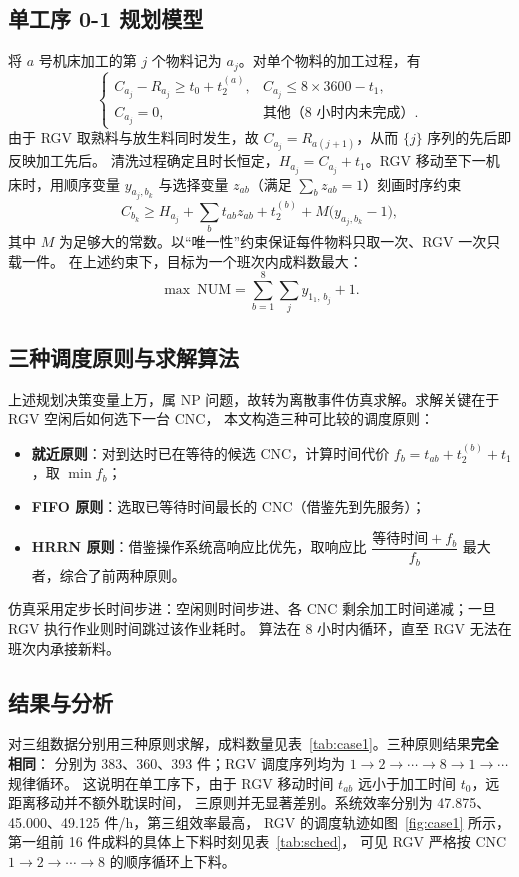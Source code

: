\documentclass{cumcmthesis}
\begin{document}
\subsection{单工序 0-1 规划模型}
将 $a$ 号机床加工的第 $j$ 个物料记为 $a_j$。对单个物料的加工过程，有
\begin{equation}
\begin{cases}
C_{a_j}-R_{a_j}\ge t_0+t_2^{(a)}, & C_{a_j}\le 8\times3600-t_1,\\
C_{a_j}=0, & \text{其他（8 小时内未完成）}.
\end{cases}
\end{equation}
由于 RGV 取熟料与放生料同时发生，故 $C_{a_j}=R_{a(j+1)}$，从而 $\{j\}$ 序列的先后即反映加工先后。
清洗过程确定且时长恒定，$H_{a_j}=C_{a_j}+t_1$。RGV 移动至下一机床时，用顺序变量 $y_{a_j,b_k}$
与选择变量 $z_{ab}$（满足 $\sum_b z_{ab}=1$）刻画时序约束
\begin{equation}
C_{b_k}\ge H_{a_j}+\sum_{b}t_{ab}z_{ab}+t_2^{(b)}+M\big(y_{a_j,b_k}-1\big),
\end{equation}
其中 $M$ 为足够大的常数。以“唯一性”约束保证每件物料只取一次、RGV 一次只载一件。
在上述约束下，目标为一个班次内成料数最大：
\begin{equation}
\max\ \mathrm{NUM}=\sum_{b=1}^{8}\sum_{j}y_{1_1,\,b_j}+1 .
\end{equation}

\subsection{三种调度原则与求解算法}
上述规划决策变量上万，属 NP 问题，故转为离散事件仿真求解。求解关键在于 RGV 空闲后如何选下一台 CNC，
本文构造三种可比较的调度原则：
\begin{itemize}
    \item \textbf{就近原则}：对到达时已在等待的候选 CNC，计算时间代价 $f_b=t_{ab}+t_2^{(b)}+t_1$，取 $\min f_b$；
    \item \textbf{FIFO 原则}：选取已等待时间最长的 CNC（借鉴先到先服务）；
    \item \textbf{HRRN 原则}：借鉴操作系统高响应比优先，取响应比
          $\dfrac{\text{等待时间}+f_b}{f_b}$ 最大者，综合了前两种原则。
\end{itemize}
仿真采用定步长时间步进：空闲则时间步进、各 CNC 剩余加工时间递减；一旦 RGV 执行作业则时间跳过该作业耗时。
算法在 8 小时内循环，直至 RGV 无法在班次内承接新料。

\subsection{结果与分析}
对三组数据分别用三种原则求解，成料数量见表~\ref{tab:case1}。三种原则结果\textbf{完全相同}：
分别为 383、360、393 件；RGV 调度序列均为 $1\to2\to\cdots\to8\to1\to\cdots$ 规律循环。
这说明在单工序下，由于 RGV 移动时间 $t_{ab}$ 远小于加工时间 $t_0$，远距离移动并不额外耽误时间，
三原则并无显著差别。系统效率分别为 47.875、45.000、49.125 件/h，第三组效率最高，
RGV 的调度轨迹如图~\ref{fig:case1} 所示，第一组前 16 件成料的具体上下料时刻见表~\ref{tab:sched}，
可见 RGV 严格按 CNC$1\to2\to\cdots\to8$ 的顺序循环上下料。
\end{document}
